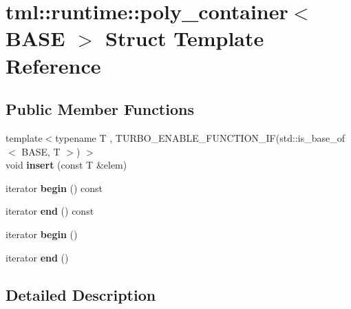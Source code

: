 \hypertarget{structtml_1_1runtime_1_1poly__container}{\section{tml\+:\+:runtime\+:\+:poly\+\_\+container$<$ B\+A\+S\+E $>$ Struct Template Reference}
\label{structtml_1_1runtime_1_1poly__container}
}
\subsection*{Public Member Functions}
\begin{DoxyCompactItemize}
\item 
\hypertarget{structtml_1_1runtime_1_1poly__container_ad90f3962cba7ef559f7a1702c456bd4d}{{\footnotesize template$<$typename T , T\+U\+R\+B\+O\+\_\+\+E\+N\+A\+B\+L\+E\+\_\+\+F\+U\+N\+C\+T\+I\+O\+N\+\_\+\+I\+F(std\+::is\+\_\+base\+\_\+of$<$ B\+A\+S\+E, T $>$) $>$ }\\void {\bfseries insert} (const T \&elem)}\label{structtml_1_1runtime_1_1poly__container_ad90f3962cba7ef559f7a1702c456bd4d}

\item 
\hypertarget{structtml_1_1runtime_1_1poly__container_a86182337dc8efa2eb0c70fb33cafaea8}{iterator {\bfseries begin} () const }\label{structtml_1_1runtime_1_1poly__container_a86182337dc8efa2eb0c70fb33cafaea8}

\item 
\hypertarget{structtml_1_1runtime_1_1poly__container_a4e7b393130762aafc42796e4cbd2c87d}{iterator {\bfseries end} () const }\label{structtml_1_1runtime_1_1poly__container_a4e7b393130762aafc42796e4cbd2c87d}

\item 
\hypertarget{structtml_1_1runtime_1_1poly__container_ab0a92141bafe2619269d1d35913e16b9}{iterator {\bfseries begin} ()}\label{structtml_1_1runtime_1_1poly__container_ab0a92141bafe2619269d1d35913e16b9}

\item 
\hypertarget{structtml_1_1runtime_1_1poly__container_a70bfb6ca4a48aa83aff52035f6ee3ac9}{iterator {\bfseries end} ()}\label{structtml_1_1runtime_1_1poly__container_a70bfb6ca4a48aa83aff52035f6ee3ac9}

\end{DoxyCompactItemize}


\subsection{Detailed Description}
